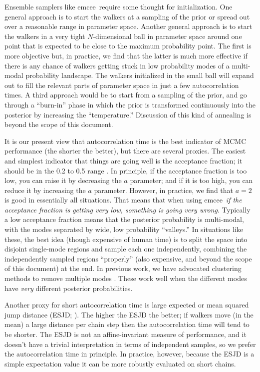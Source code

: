 \documentclass[12pt,preprint]{aastex}
\newcommand{\project}[1]{{\sffamily #1}}
\newcommand{\thisplain}{emcee}
\newcommand{\this}{\project{\thisplain}}
\begin{document}
Ensemble samplers like \this\ require some thought for initialization.
One general approach is to start the walkers at a sampling of the
prior or spread out over a reasonable range in parameter space.
Another general approach is to start the walkers in a very tight
$N$-dimensional ball in parameter space around one point that is
expected to be close to the maximum probability point.  The first is
more objective but, in practice, we find that the latter is much more
effective if there is any chance of walkers getting stuck in low
probability modes of a multi-modal probability landscape.  The walkers
initialized in the small ball will expand out to fill the relevant
parts of parameter space in just a few autocorrelation times.  A third
approach would be to start from a sampling of the prior, and go
through a ``burn-in'' phase in which the prior is transformed
continuously into the posterior by increasing the ``temperature.''
Discussion of this kind of annealing is beyond the scope of this
document.

It is our present view that autocorrelation time is the best indicator
of MCMC performance (the shorter the better), but there are several
proxies.  The easiest and simplest indicator that things are going
well is the acceptance fraction; it should be in the 0.2 to 0.5 range
\citep[there are theorems about this for specific problems;
for example][]{Gelman:1996}.  In principle,
if the acceptance fraction is too low, you can raise it by decreasing
the $a$ parameter; and if it is too high, you can reduce it by
increasing the $a$ parameter.  However, in practice, we find that
$a=2$ is good in essentially all situations.  That means that when
using \this\ \emph{if the acceptance fraction is getting very low,
  something is going very wrong}.  Typically a low acceptance fraction
means that the posterior probability is multi-modal, with the modes
separated by wide, low probability ``valleys.''  In situations like
these, the best idea (though expensive of human time) is to split the
space into disjoint single-mode regions and sample each one
independently, combining the independently sampled regions
``properly'' (also expensive, and beyond the scope of this document)
at the end.  In previous work, we have advocated clustering methods to
remove multiple modes \citep{Hou:2011}.  These work well when the
different modes have \emph{very} different posterior probabilities.

Another proxy for short autocorrelation time is large expected or mean
squared jump distance (ESJD; \citealt{Pasarica:2010}).  The higher the
ESJD the better; if walkers move (in the mean) a large distance per
chain step then the
autocorrelation time will tend to be shorter.  The ESJD is not an
affine-invariant measure of performance, and it doesn't have a
trivial interpretation in terms of independent samples, so we prefer
the autocorrelation time in principle.  In practice, however, because
the ESJD is a simple expectation value it can be more robustly
evaluated on short chains.
\end{document}

